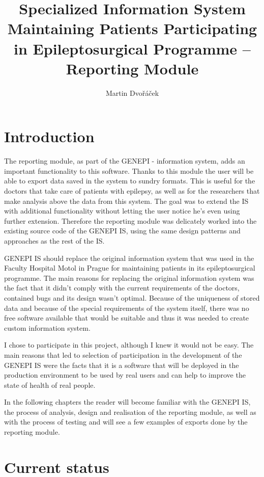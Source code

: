 \documentclass[thesis=B,english]{FITthesis}[2012/10/20]
\title{Specialized Information System Maintaining Patients Participating in Epileptosurgical Programme – Reporting Module}
\author{Martin Dvořáček} %
\begin{document}

\chapter{Introduction}
The reporting module, as part of the GENEPI - information system, adds an important functionality to this software. Thanks to this module the user will be able to export data saved in the system to sundry formats. This is useful for the doctors that take care of patients with epilepsy, as well as for the researchers that make analysis above the data from this system. The goal was to extend the IS with additional functionality without letting the user notice he's even using further extension. Therefore the reporting module was delicately worked into the existing source code of the GENEPI IS, using the same design patterns and approaches as the rest of the IS.

GENEPI IS should replace the original information system that was used in the Faculty Hospital Motol in Prague for maintaining patients in its epileptosurgical programme. The main reasons for replacing the original information system was the fact that it didn't comply with the current requirements of the doctors, contained bugs and its design wasn't optimal. Because of the uniqueness of stored data and because of the special requirements of the system itself, there was no free software available that would be suitable and thus it was needed to create custom information system.

I chose to participate in this project, although I knew it would not be easy. The main reasons that led to selection of participation in the development of the GENEPI IS were the facts that it is a software that will be deployed in the production environment to be used by real users and can help to improve the state of health of real people. 

In the following chapters the reader will become familiar with the GENEPI IS, the process of analysis, design and realisation of the reporting module, as well as with the process of testing and will see a few examples of exports done by the reporting module.

\chapter{Current status}
\end{document}
